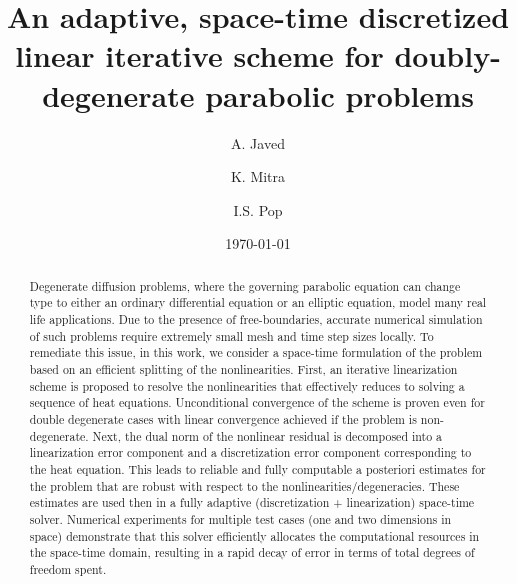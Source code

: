 \documentclass[review,11pt]{article}
\title{An adaptive, space-time discretized linear iterative scheme for doubly-degenerate parabolic problems}
\author[1]{A. Javed}
\author[2]{K. Mitra}
\author[1]{I.S. Pop}
\affil[1]{Hasselt University, Belgium}
\affil[2]{Eindhoven University of Technology, The Netherlands}
\date{\today}
\numberwithin{equation}{section}
\begin{document}
\maketitle
\begin{abstract}
Degenerate diffusion problems, where the governing parabolic equation can change type to either an ordinary differential equation or an elliptic equation, model many real life applications. Due to the presence of free-boundaries, accurate numerical simulation of such problems require extremely small mesh and time step sizes locally. To remediate this issue, in this work, we consider a space-time formulation of the problem based on an efficient splitting of the nonlinearities.  First, an iterative linearization scheme is proposed to resolve the nonlinearities that effectively reduces to solving a sequence of heat equations. Unconditional convergence of the scheme is proven even for double degenerate cases with linear convergence achieved if the problem is non-degenerate. Next,  the dual norm of the nonlinear residual is decomposed into a linearization error component and a discretization error component corresponding to the heat equation. This leads to reliable and fully computable a posteriori estimates for the problem that are robust with respect to the nonlinearities/degeneracies. These estimates are used then in a fully adaptive (discretization + linearization) space-time solver. Numerical experiments for multiple test cases (one and two dimensions in space) demonstrate that this solver efficiently allocates the computational resources in the space-time domain, resulting in a rapid decay of error in terms of total degrees of freedom spent.



\end{abstract}
\end{document}
